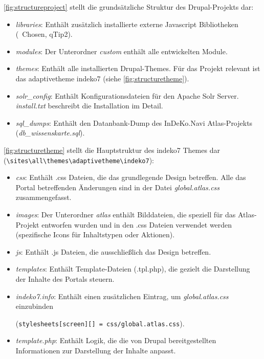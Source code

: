 \cref{fig:structureproject} stellt die grundsätzliche Struktur des Drupal-Projekts dar:
\begin{itemize}
	\item \textit{libraries}: Enthält zusätzlich installierte externe Javascript Bibliotheken (\zB\ Chosen, qTip2).

	\item \textit{modules}: Der Unterordner \textit{custom} enthält alle entwickelten Module.

	\item \textit{themes}: Enthält alle installierten Drupal-Themes. Für das Projekt relevant ist das adaptivetheme indeko7 (siehe \cref{fig:structuretheme}).

	\item \textit{solr\_config}: Enthält Konfigurationsdateien für den Apache Solr Server. \textit{install.txt} beschreibt die Installation im Detail.

	\item \textit{sql\_dumps}: Enthält den Datanbank-Dump des InDeKo.Navi Atlas-Projekts  (\textit{db\_wissenskarte.sql}).
\end{itemize}



\cref{fig:structuretheme} stellt die Hauptstruktur des indeko7 Themes dar (\lstinline|\sites\all\themes\adaptivetheme\indeko7|):
\begin{itemize}
	\item \textit{css}: Enthält .css Dateien, die das grundlegende Design betreffen. Alle das Portal betreffenden Änderungen sind in der Datei \textit{global.atlas.css} zusammengefasst.

	\item \textit{images}: Der Unterordner \textit{atlas} enthält Bilddateien, die speziell für das Atlas-Projekt entworfen wurden und in den .css Dateien verwendet werden (\zB spezifische Icons für Inhaltstypen oder Aktionen).

	\item \textit{js}: Enthält .js Dateien, die ausschließlich das Design betreffen.

	\item \textit{templates}: Enthält Template-Dateien (.tpl.php), die gezielt die Darstellung der Inhalte des Portals steuern.

	\item \textit{indeko7.info}: Enthält einen zusätzlichen Eintrag, um \textit{global.atlas.css} einzubinden

	(\lstinline|stylesheets[screen][] = css/global.atlas.css|).

	\item \textit{template.php}: Enthält Logik, die die von Drupal bereitgestellten Informationen zur Darstellung der Inhalte anpasst.

\end{itemize}




